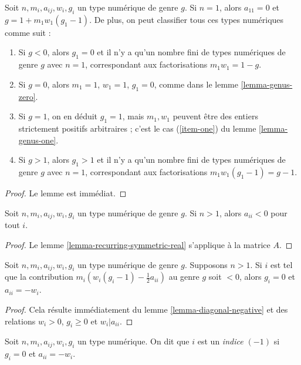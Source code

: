 \begin{lemma}
\label{lemma-irreducible}
Soit $n, m_i, a_{ij}, w_i, g_i$ un type numérique de genre $g$.
Si $n = 1$, alors $a_{11} = 0$ et $g = 1 + m_1w_1(g_1 - 1)$.
De plus, on peut classifier tous ces types numériques comme suit :
\begin{enumerate}
\item Si $g < 0$, alors $g_1 = 0$ et il n'y a qu'un nombre fini de
types numériques de genre $g$ avec $n = 1$, correspondant aux factorisations
$m_1w_1 = 1 - g$.
\item Si $g = 0$, alors $m_1 = 1$, $w_1 = 1$, $g_1 = 0$,
comme dans le lemme \ref{lemma-genus-zero}.
\item Si $g = 1$, on en déduit $g_1 = 1$, mais $m_1, w_1$ peuvent être des entiers
strictement positifs arbitraires ; c'est le cas
(\ref{item-one}) du lemme \ref{lemma-genus-one}.
\item Si $g > 1$, alors $g_1 > 1$ et il n'y a qu'un nombre fini de
types numériques de genre $g$ avec $n = 1$, correspondant aux
factorisations $m_1w_1(g_1 - 1) = g - 1$.
\end{enumerate}
\end{lemma}

\begin{proof}
Le lemme est immédiat.
\end{proof}

\begin{lemma}
\label{lemma-diagonal-negative}
Soit $n, m_i, a_{ij}, w_i, g_i$ un type numérique de genre $g$.
Si $n > 1$, alors $a_{ii} < 0$ pour tout $i$.
\end{lemma}

\begin{proof}
Le lemme \ref{lemma-recurring-symmetric-real} s'applique à la matrice $A$.
\end{proof}

\begin{lemma}
\label{lemma-minus-one}
Soit $n, m_i, a_{ij}, w_i, g_i$ un type numérique de genre $g$.
Supposons $n > 1$. Si $i$ est tel que la contribution
$m_i(w_i(g_i - 1) - \frac{1}{2} a_{ii})$
au genre $g$ soit $< 0$, alors $g_i = 0$ et $a_{ii} = -w_i$.
\end{lemma}

\begin{proof}
Cela résulte immédiatement du lemme \ref{lemma-diagonal-negative} et des relations
$w_i > 0$, $g_i \geq 0$ et $w_i | a_{ii}$.
\end{proof}

\begin{definition}
\label{definition-type-minus-one}
Soit $n, m_i, a_{ij}, w_i, g_i$ un type numérique.
On dit que $i$ est un {\it indice $(-1)$} si $g_i = 0$ et $a_{ii} = -w_i$.
\end{definition}

